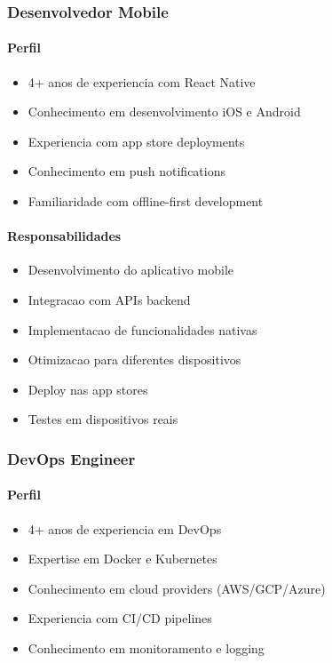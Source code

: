 \subsubsection{Desenvolvedor Mobile}
\paragraph{Perfil}
\begin{itemize}
    \item 4+ anos de experiencia com React Native
    \item Conhecimento em desenvolvimento iOS e Android
    \item Experiencia com app store deployments
    \item Conhecimento em push notifications
    \item Familiaridade com offline-first development
\end{itemize}

\paragraph{Responsabilidades}
\begin{itemize}
    \item Desenvolvimento do aplicativo mobile
    \item Integracao com APIs backend
    \item Implementacao de funcionalidades nativas
    \item Otimizacao para diferentes dispositivos
    \item Deploy nas app stores
    \item Testes em dispositivos reais
\end{itemize}

\subsubsection{DevOps Engineer}
\paragraph{Perfil}
\begin{itemize}
    \item 4+ anos de experiencia em DevOps
    \item Expertise em Docker e Kubernetes
    \item Conhecimento em cloud providers (AWS/GCP/Azure)
    \item Experiencia com CI/CD pipelines
    \item Conhecimento em monitoramento e logging
\end{itemize}

